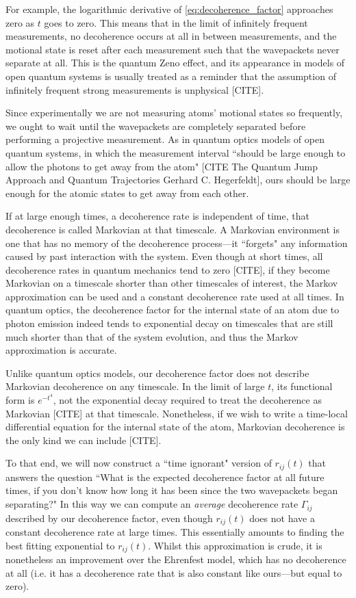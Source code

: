 For example, the logarithmic derivative of \eqref{eq:decoherence_factor} approaches zero as $t$ goes to zero. This means that in the limit of infinitely frequent measurements, no decoherence occurs at all in between measurements, and the motional state is reset after each measurement such that the wavepackets never separate at all. This is the quantum Zeno effect, and its appearance in models of open quantum systems is usually treated as a reminder that the assumption of infinitely frequent strong measurements is unphysical [CITE].

Since experimentally we are not measuring atoms' motional states so frequently, we ought to wait until the wavepackets are completely separated before performing a projective measurement. As in quantum optics models of open quantum systems, in which the measurement interval ``should be large enough to allow the photons to get away from the atom" [CITE The Quantum Jump Approach
and Quantum Trajectories Gerhard C. Hegerfeldt], ours should be large enough for the atomic states to get away from each other.

If at large enough times, a decoherence rate is independent of time, that decoherence is called Markovian at that timescale. A Markovian environment is one that has no memory of the decoherence process---it ``forgets" any information caused by past interaction with the system. Even though at short times, all decoherence rates in quantum mechanics tend to zero [CITE], if they become Markovian on a timescale shorter than other timescales of interest, the Markov approximation can be used and a constant decoherence rate used at all times. In quantum optics, the decoherence factor for the internal state of an atom due to photon emission indeed tends to exponential decay on timescales that are still much shorter than that of the system evolution, and thus the Markov approximation is accurate.

Unlike quantum optics models, our decoherence factor does not describe Markovian decoherence on any timescale. In the limit of large $t$, its functional form is $e^{-t^4}$, not the exponential decay required to treat the decoherence as Markovian [CITE] at that timescale. Nonetheless, if we wish to write a time-local differential equation for the internal state of the atom, Markovian decoherence is the only kind we can include [CITE].

To that end, we will now construct a ``time ignorant" version of $r_{ij}(t)$ that answers the question ``What is the expected decoherence factor at all future times, if you don't know how long it has been since the two wavepackets began separating?" In this way we can compute an \emph{average} decoherence rate $\Gamma_{ij}$ described by our decoherence factor, even though $r_{ij}(t)$ does not have a constant decoherence rate at large times. This essentially amounts to finding the best fitting exponential to $r_{ij}(t)$. Whilst this approximation is crude, it is nonetheless an improvement over the Ehrenfest model, which has no decoherence at all (i.e. it has a decoherence rate that is also constant like ours---but equal to zero).

